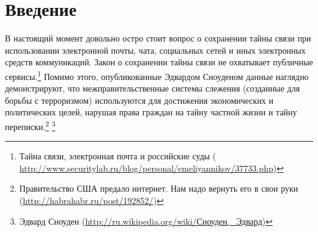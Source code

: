 \newpage
\addtocounter{chapter}{1}
\tableofcontents
\newpage
\section{Введение}
В настоящий момент довольно остро стоит вопрос о сохранении тайны связи при использовании электронной почты, чата, социальных сетей и иных электронных средств коммуникаций. Закон о сохранении тайны связи не охватывает публичные сервисы.\footnote{ Тайна связи, электронная почта и российские суды ( \url {http://www.securitylab.ru/blog/personal/emeliyannikov/37733.php})}
Помимо этого, опубликованные Эдвардом Сноуденом данные наглядно демонстрируют, что межправительственные системы слежения (созданные для борьбы с терроризмом) используются для достижения экономических и политических целей,  нарушая права граждан на тайну частной жизни и тайну переписки.\footnote{Правительство США предало интернет. Нам надо вернуть его в свои руки (\url{http://habrahabr.ru/post/192852/})} \footnote{Эдвард Сноуден (\url{http://ru.wikipedia.org/wiki/Сноуден,\_Эдвард})}\\

